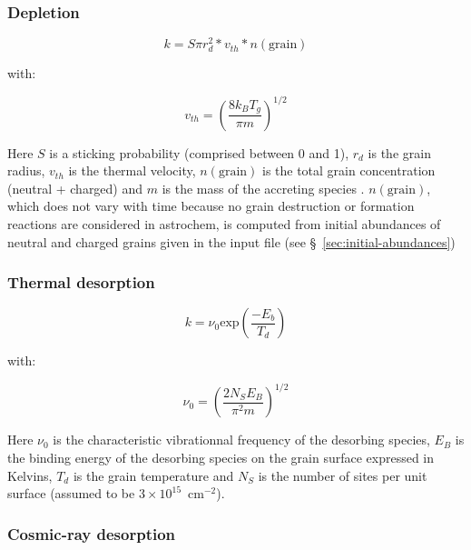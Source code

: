 \documentclass[a4paper,12pt]{article}
\newcommand{\conc}[1]{n(\mathrm{#1})}
\begin{document}
{\subsubsection{Depletion}
\label{sec:depletion}

\begin{equation}
  k = S \pi r_{d}^2 * v_{th} * \conc{grain}
  \label{eq:depletion}
\end{equation}

\noindent
with:

\begin{equation}
  v_{th} = \left( \frac{8 k_{B} T_{g}}{\pi m} \right)^{1/2}
  \label{eq:thermal-veloc}
\end{equation}

\noindent
Here $S$ is a sticking probability (comprised between 0 and 1),
$r_{d}$ is the grain radius, $v_{th}$ is the thermal velocity,
$\conc{grain}$ is the total grain concentration (neutral + charged)
and $m$ is the mass of the accreting species
\citep{Bergin95}. $\conc{grain}$, which does not vary with time
because no grain destruction or formation reactions are considered in
astrochem, is computed from initial abundances of neutral and charged
grains given in the input file (see \S~\ref{sec:initial-abundances})

\subsubsection{Thermal desorption}
\label{sec:thermal-desorption}

\begin{equation}
  k = \nu_{0} \mathrm{exp} \left( \frac{-E_{b}}{T_{d}} \right)
  \label{eq:thermal-desorption}
\end{equation}

\noindent
with:

\begin{equation}
  \nu_{0} = \left( \frac{2 N_{S} E_{B}}{\pi^2 m} \right)^{1/2}
  \label{eq:vibration-freq}
\end{equation}

\noindent
Here $\nu_{0}$ is the characteristic vibrationnal frequency of the
desorbing species, $E_{B}$ is the binding energy of the desorbing
species on the grain surface expressed in Kelvins, $T_{d}$ is the
grain temperature and $N_{S}$ is the number of sites per unit surface
(assumed to be $3 \times 10^{15}$~cm$^{-2}$).

\subsubsection{Cosmic-ray desorption}
\label{sec:cosm-ray-desorpt}

}
\end{document}
